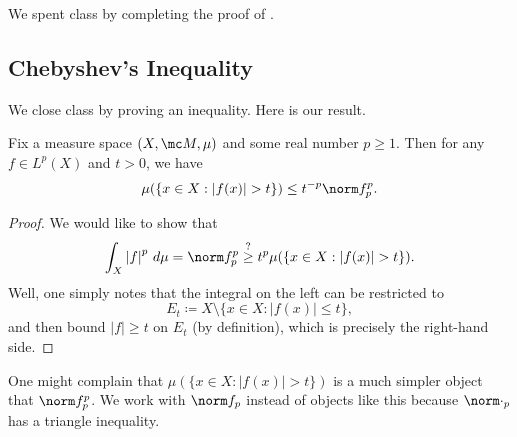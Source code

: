 \documentclass[../notes.tex]{subfiles}
\begin{document}
We spent class by completing the proof of .

\subsection{Chebyshev's Inequality}
We close class by proving an inequality. Here is our result.
\begin{proposition}
	Fix a measure space $(X,\mc M,\mu)$ and some real number $p\ge1$. Then for any $f\in L^p(X)$ and $t>0$, we have
	\[\mu(\{x\in X:\left|f(x)\right|>t\})\le t^{-p}\norm f_p^p.\]
\end{proposition}
\begin{proof}
	We would like to show that
	\[\int_X\left|f\right|^p\,d\mu=\norm f_p^p\stackrel?\ge t^p\mu(\{x\in X:\left|f(x)\right|>t\}).\]
	Well, one simply notes that the integral on the left can be restricted to
	\[E_t\coloneqq X\setminus\{x\in X:\left|f(x)\right|\le t\},\]
	and then bound $\left|f\right|\ge t$ on $E_t$ (by definition), which is precisely the right-hand side.
\end{proof}
\begin{remark}
	One might complain that $\mu(\{x\in X:\left|f(x)\right|>t\})$ is a much simpler object that $\norm f_p^p$. We work with $\norm f_p$ instead of objects like this because $\norm\cdot_p$ has a triangle inequality.
\end{remark}
\end{document}
